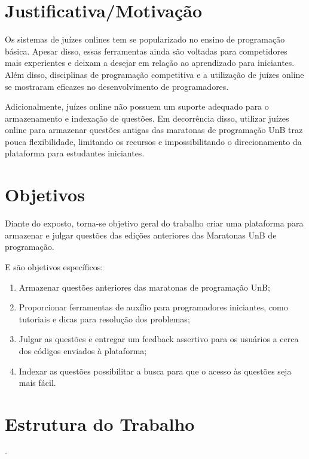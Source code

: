 \section{Justificativa/Motivação}

Os sistemas de juízes onlines tem se popularizado no ensino de programação básica. Apesar disso, essas ferramentas ainda são voltadas para competidores mais experientes e deixam a desejar em relação ao aprendizado para iniciantes. Além disso, disciplinas de programação competitiva e a utilização de juízes online se mostraram eficazes no desenvolvimento de programadores.

Adicionalmente, juízes online não possuem um suporte adequado para o armazenamento e indexação de questões. Em decorrência disso, utilizar juízes online para armazenar questões antigas das maratonas de programação UnB traz pouca flexibilidade, limitando os recursos e impossibilitando o direcionamento da plataforma para estudantes iniciantes.

\section{Objetivos}

Diante do exposto, torna-se objetivo geral do trabalho criar uma plataforma para armazenar e julgar questões das edições anteriores das Maratonas UnB de programação.

E são objetivos específicos: 
\begin{enumerate}
    \item Armazenar questões anteriores das maratonas de programação UnB;
    \item Proporcionar ferramentas de auxílio para programadores iniciantes, como tutoriais e dicas para resolução dos problemas;
    \item Julgar as questões e entregar um feedback assertivo para os usuários a cerca dos códigos enviados à plataforma;
    \item Indexar as questões possibilitar a busca para que o acesso às questões seja mais fácil.
\end{enumerate}

\section{Estrutura do Trabalho}

-

